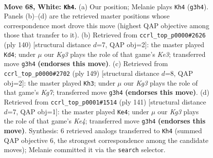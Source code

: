 \documentclass[11pt]{article}
\begin{document}
\clearpage

\begin{figure}[p]\centering
\begin{subfigure}{0.46\textwidth}\centering
\resizebox{\linewidth}{!}{%
\newchessgame
\chessboard[
  setfen={5r1k/P3R3/8/8/8/6K1/8/8 w - - 5 68},
  showmover=false,
  pgfstyle=straightmove, color=movearrow, markmove={g3-h4}
]}
\caption{}
\end{subfigure}\hfill
\begin{subfigure}{0.46\textwidth}\centering
\resizebox{\linewidth}{!}{%
\newchessgame
\chessboard[
  setfen={5r2/8/5k2/3P4/8/4K1R1/8/8 w - - 3 71},
  showmover=false,
  pgfstyle=straightmove, color=movearrow, markmove={e3-d4}
]}
\caption{}
\end{subfigure}
\\[4pt]
\begin{subfigure}{0.46\textwidth}\centering
\resizebox{\linewidth}{!}{%
\newchessgame
\chessboard[
  setfen={8/4r3/1K3R2/6pB/8/8/6k1/8 b - - 5 75},
  showmover=false,
  pgfstyle=straightmove, color=movearrow, markmove={g2-h3}
]}
\caption{}
\end{subfigure}\hfill
\begin{subfigure}{0.46\textwidth}\centering
\resizebox{\linewidth}{!}{%
\newchessgame
\chessboard[
  setfen={5R2/8/8/4k1pP/8/6r1/2K5/8 b - - 9 71},
  showmover=false,
  pgfstyle=straightmove, color=movearrow, markmove={e5-e4}
]}
\caption{}
\end{subfigure}
\caption{\textbf{Move 68, White: \texttt{Kh4}.} (a) Our position; Melanie plays \texttt{Kh4} (\texttt{g3h4}). Panels (b)--(d) are the retrieved master positions whose correspondence most drove this move (highest QAP objective among those that transfer to it). (b) Retrieved from \texttt{ccrl\_top\_p0000\#2626} (ply 140) [structural distance $d$=7, QAP obj=2]: the master played \texttt{Kd4}; under $\mu$ our \emph{Kg3} plays the role of that game's \emph{Ke3}; transferred move \texttt{g3h4} \textbf{(endorses this move)}. (c) Retrieved from \texttt{ccrl\_top\_p0000\#2702} (ply 149) [structural distance $d$=8, QAP obj=2]: the master played \texttt{Kh3}; under $\mu$ our \emph{Kg3} plays the role of that game's \emph{Kg7}; transferred move \texttt{g3h4} \textbf{(endorses this move)}. (d) Retrieved from \texttt{ccrl\_top\_p0001\#1514} (ply 141) [structural distance $d$=7, QAP obj=1]: the master played \texttt{Ke4}; under $\mu$ our \emph{Kg3} plays the role of that game's \emph{Ke4}; transferred move \texttt{g3h4} \textbf{(endorses this move)}. Synthesis: 6 retrieved analogs transferred to \texttt{Kh4} (summed QAP objective 6, the strongest correspondence among the candidate moves); Melanie committed it via the \texttt{search} selector.}
\label{fig:thought-m134}
\end{figure}
\end{document}
